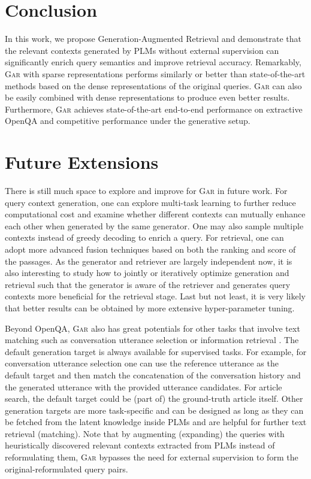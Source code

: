 \documentclass[11pt,a4paper]{article}
\newcommand{\ours}{\textsc{Gar}\xspace}
\begin{document}
\section{Conclusion}
In this work, we propose Generation-Augmented Retrieval and demonstrate that the relevant contexts generated by PLMs without external supervision can significantly enrich query semantics and improve retrieval accuracy.
Remarkably, \ours with sparse representations performs similarly or better than state-of-the-art methods based on the dense representations of the original queries. \ours can also be easily combined with dense representations to produce even better results.
Furthermore, \ours achieves state-of-the-art end-to-end performance on extractive OpenQA and competitive performance under the generative setup.

\section{Future Extensions}
There is still much space to explore and improve for \ours in future work.
For query context generation, one can explore multi-task learning to further reduce computational cost and examine whether different contexts can mutually enhance each other when generated by the same generator.
One may also sample multiple contexts instead of greedy decoding to enrich a query.
For retrieval, one can adopt more advanced fusion techniques based on both the ranking and score of the passages.
As the generator and retriever are largely independent now, it is also interesting to study how to jointly or iteratively optimize generation and retrieval such that the generator is aware of the retriever and generates query contexts more beneficial for the retrieval stage.
Last but not least, it is very likely that better results can be obtained by more extensive hyper-parameter tuning.

Beyond OpenQA, \ours also has great potentials for other tasks that involve text matching such as conversation utterance selection \cite{lowe2015ubuntu,dinan2020second} or information retrieval \cite{nguyen2016ms,craswell2020overview}.
The default generation target is always available for supervised tasks. For example, for conversation utterance selection one can use the reference utterance as the default target and then match the concatenation of the conversation history and the generated utterance with the provided utterance candidates.
For article search, the default target could be (part of) the ground-truth article itself.
Other generation targets are more task-specific and can be designed as long as they can be fetched from the latent knowledge inside PLMs and are helpful for further text retrieval (matching).
Note that by augmenting (expanding) the queries with heuristically discovered relevant contexts extracted from PLMs instead of reformulating them, \ours bypasses the need for external supervision to form the original-reformulated query pairs.
\end{document}
